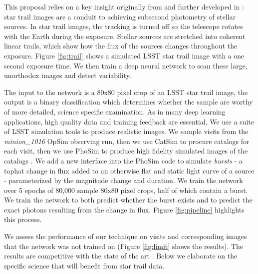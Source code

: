 \documentclass[12pt, letterpaper]{article}
\begin{document}
This proposal relies on a key insight originally from \cite{1986PASP...98..802H} and further developed in \cite{mine}: star trail images are a conduit to achieving subsecond photometry of stellar sources. In star trail images, the tracking is turned off so the telescope rotates with the Earth during the exposure. Stellar sources are stretched into coherent linear trails, which show how the flux of the sources changes throughout the exposure. Figure \ref{fig:trail} shows a simulated LSST star trail image with a one second exposure time. We then train a deep neural network to scan these large, unorthodox images and detect variability.

The input to the network is a 80x80 pixel crop of an LSST star trail image, the output is a binary classification which determines whether the sample are worthy of more detailed, science specific examination. As in many deep learning applications, high quality data and training feedback are essential. We use a suite of LSST simulation tools to produce realistic images. We sample visits from the \textit{minion\_1016} OpSim observing run, then we use CatSim to procure catalogs for each visit, then we use PhoSim to produce high fidelity simulated images of the catalogs \citep{2014SPIE.9150E..15D,2014SPIE.9150E..14C,2015ApJS..218...14P}. We add a new interface into the PhoSim code to simulate \textit{bursts} - a tophat change in flux added to an otherwise flat and static light curve of a source - parameterized by the magnitude change and duration. We train the network over 5 epochs of 80,000 sample 80x80 pixel crops, half of which contain a burst. We train the network to both predict whether the burst exists and to predict the exact photons resulting from the change in flux. Figure \ref{fig:pipeline} highlights this process. 

We assess the performance of our technique on visits and corresponding images that the network was not trained on (Figure \ref{fig:limit} shows the results). The results are competitive with the state of the art \citep{2016SPIE.9908E..0YD}. Below we elaborate on the specific science that will benefit from star trail data.
\end{document}
